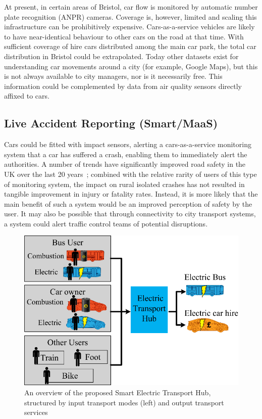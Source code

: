 \documentclass[b5paper,10pt]{article}
\begin{document}
At present, in certain areas of Bristol, car flow is monitored by
automatic number plate recognition (ANPR) cameras. Coverage is,
however, limited and scaling this infrastructure can be prohibitively
expensive. Cars-as-a-service vehicles are likely to have
near-identical behaviour to other cars on the road at that time. With
sufficient coverage of hire cars distributed among the main car park,
the total car distribution in Bristol could be extrapolated. Today
other datasets exist for understanding car movements around a city
(for example, Google Maps), but this is not always available to city
managers, nor is it necessarily free. This information could be
complemented by data from air quality sensors directly affixed to
cars.



\subsection{Live Accident Reporting (Smart/MaaS)}

Cars could be fitted with impact sensors, alerting a cars-as-a-service
monitoring system that a car has suffered a crash, enabling them to
immediately alert the authorities. A number of trends have
significantly improved road safety in the UK over the last 20
years~\citep{dftsafetystats:2018}; combined with the relative rarity
of users of this type of monitoring system, the impact on rural
isolated crashes has not resulted in tangible improvement in injury or
fatality rates. Instead, it is more likely that the main benefit of
such a system would be an improved perception of safety by the
user. It may also be possible that through connectivity to city
transport systems, a system could alert traffic control teams of
potential disruptions.

\begin{figure}[htb]
\centering
\includegraphics[width=0.75\columnwidth]{images/bristolhub.png}
\caption{An overview of the proposed Smart Electric
  Transport Hub, structured by input transport modes (left) and output
  transport services}
\label{fig:bristolhub}
\end{figure}
\end{document}
